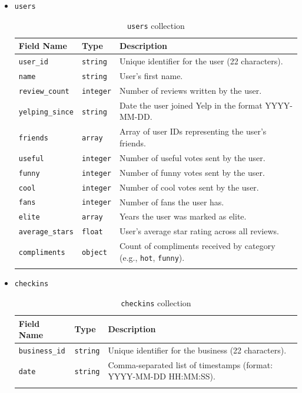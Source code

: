 \documentclass{Configuration_Files/PoliMi3i_thesis}
\begin{document}
\begin{itemize}
\item{\texttt{users}}
\begin{longtable}{|p{3cm}|p{2.5cm}|p{10cm}|}
\hline
\textbf{Field Name} & \textbf{Type} & \textbf{Description} \\ \hline
\texttt{user\_id} & \texttt{string} & Unique identifier for the user (22 characters). \\ \hline
\texttt{name} & \texttt{string} & User's first name. \\ \hline
\texttt{review\_count} & \texttt{integer} & Number of reviews written by the user. \\ \hline
\texttt{yelping\_since} & \texttt{string} & Date the user joined Yelp in the format YYYY-MM-DD. \\ \hline
\texttt{friends} & \texttt{array} & Array of user IDs representing the user's friends. \\ \hline
\texttt{useful} & \texttt{integer} & Number of useful votes sent by the user. \\ \hline
\texttt{funny} & \texttt{integer} & Number of funny votes sent by the user. \\ \hline
\texttt{cool} & \texttt{integer} & Number of cool votes sent by the user. \\ \hline
\texttt{fans} & \texttt{integer} & Number of fans the user has. \\ \hline
\texttt{elite} & \texttt{array} & Years the user was marked as elite. \\ \hline
\texttt{average\_stars} & \texttt{float} & User's average star rating across all reviews. \\ \hline
\texttt{compliments} & \texttt{object} & Count of compliments received by category (e.g., \texttt{hot}, \texttt{funny}). \\ \hline
\caption{\texttt{users} collection}
\end{longtable}

\item{\texttt{checkins}}
\begin{longtable}{|p{3cm}|p{2.5cm}|p{10cm}|}
\hline
\textbf{Field Name} & \textbf{Type} & \textbf{Description} \\ \hline
\texttt{business\_id} & \texttt{string} & Unique identifier for the business (22 characters). \\ \hline
\texttt{date} & \texttt{string} & Comma-separated list of timestamps (format: YYYY-MM-DD HH:MM:SS). \\ \hline
\caption{\texttt{checkins} collection}
\end{longtable}

\end{itemize}
\end{document}
